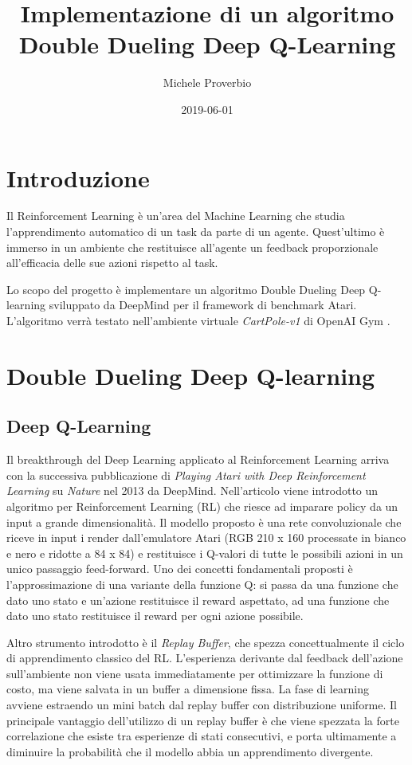 \documentclass{article}
\title{Implementazione di un algoritmo Double Dueling Deep Q-Learning}
\date{2019-06-01}
\author{Michele Proverbio}
\begin{document}
	\maketitle
	\newpage

	\section{Introduzione}
		Il Reinforcement Learning è un'area del Machine Learning che studia l'apprendimento automatico di un task da parte di un agente. Quest'ultimo è immerso in un ambiente che restituisce all'agente un feedback proporzionale all'efficacia delle sue azioni rispetto al task.

		Lo scopo del progetto è implementare un algoritmo Double Dueling Deep Q-learning \cite{nature_dqn} \cite{1509.06461} \cite{1511.06581} sviluppato da DeepMind \cite{deepmind} per il framework di benchmark Atari. L'algoritmo verrà testato nell'ambiente virtuale \textit{CartPole-v1} di OpenAI Gym \cite{open.ai}.

	\section{Double Dueling Deep Q-learning}
	\subsection{Deep Q-Learning}
		Il breakthrough del Deep Learning applicato al Reinforcement Learning arriva con la successiva pubblicazione di \textit{Playing Atari with Deep Reinforcement Learning} \cite{nature_dqn} su \textit{Nature} nel 2013 da DeepMind. Nell'articolo viene introdotto un algoritmo per Reinforcement Learning (RL) che riesce ad imparare policy da un input a grande dimensionalità. Il modello proposto è una rete convoluzionale che riceve in input i render dall'emulatore Atari (RGB 210 x 160 processate in bianco e nero e ridotte a 84 x 84) e restituisce i Q-valori di tutte le possibili azioni in un unico passaggio feed-forward. Uno dei concetti fondamentali proposti è l'approssimazione di una variante della funzione Q: si passa da una funzione che dato uno stato e un'azione restituisce il reward aspettato, ad una funzione che dato uno stato restituisce il reward per ogni azione possibile.

		Altro strumento introdotto è il \textit{Replay Buffer}, che spezza concettualmente il ciclo di apprendimento classico del RL. L'esperienza derivante dal feedback dell'azione sull'ambiente non viene usata immediatamente per ottimizzare la funzione di costo, ma viene salvata in un buffer a dimensione fissa. La fase di learning avviene estraendo un mini batch dal replay buffer con distribuzione uniforme. Il principale vantaggio dell'utilizzo di un replay buffer è che viene spezzata la forte correlazione che esiste tra esperienze di stati consecutivi, e porta ultimamente a diminuire la probabilità che il modello abbia un apprendimento divergente.
\end{document}
